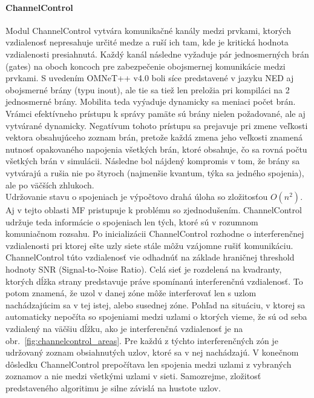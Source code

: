 \paragraph{ChannelControl}
\indent Modul \ttfamily ChannelControl \rmfamily vytvára komunikačné kanály medzi prvkami, ktorých vzdialenosť nepresahuje určité medze a ruší ich tam, kde je kritická hodnota vzdialenosti presiahnutá. Každý kanál následne vyžaduje pár jednosmerných brán (\ttfamily gates\rmfamily) na oboch koncoch pre zabezpečenie obojsmernej komunikácie medzi prvkami. S uvedením OMNeT++ v4.0 boli síce predstavené v jazyku NED aj obojsmerné brány (typu \ttfamily inout\rmfamily), ale tie sa tiež len preložia pri kompiláci na 2 jednosmerné brány. Mobilita teda vyýaduje dynamicky sa meniaci počet brán. Vrámci efektívneho prístupu k správy pamäte sú brány nielen požadované, ale aj vytvárané dynamicky. Negatívum tohoto prístupu sa prejavuje pri zmene veľkosti vektora obsahujúceho zoznam brán, pretože každá zmena jeho veľkosti znamená nutnosť opakovaného napojenia všetkých brán, ktoré obsahuje, čo sa rovná počtu všetkých brán v simulácii. Následne bol nájdený kompromis v tom, že brány sa vytvárajú a rušia nie po štyroch (najmenšie kvantum, týka sa jedného spojenia), ale po väčších zhlukoch.\\
\indent Udržovanie stavu o spojeniach je výpočtovo drahá úloha so zložitosťou $O(n^2)$. Aj v tejto oblasti MF pristupuje k problému so zjednodušením. \ttfamily ChannelControl \rmfamily udržuje teda informácie o spojeniach len tých, ktoré sú v rozumnom komuniačnom rozsahu. Po inicializácii \ttfamily ChannelControl \rmfamily rozhodne o interferenčnej vzdialenosti pri ktorej ešte uzly siete stále môžu vzájomne rušiť komunikáciu. \ttfamily ChannelControl \rmfamily túto vzdialenosť vie odhadnúť na základe hraničnej threshold hodnoty SNR (Signal-to-Noise Ratio). Celá sieť je rozdelená na kvadranty, ktorých dĺžka strany predstavuje práve spomínanú interferenčnú vzdialenosť. To potom znamená, že uzol v danej zóne môže interferovať len s uzlom nachádzajúcim sa v tej istej, alebo susednej zóne. Pohľad na situáciu, v ktorej sa automaticky nepočíta so spojeniami medzi uzlami o ktorých vieme, že sú od seba vzdialený na väčšiu dĺžku, ako je interferenčná vzdialenosť je na obr.~\ref{fig:channelcontrol_areas}. Pre každú z týchto interferenčných zón je udržovaný zoznam obsiahnutých uzlov, ktoré sa v nej nachádzajú. V konečnom dôsledku \ttfamily ChannelControl \rmfamily prepočítava len spojenia medzi uzlami z vybraných zoznamov a nie medzi všetkými uzlami v sieti. Samozrejme, zložitosť predstaveného algoritimu je silne závislá na hustote uzlov.\\

